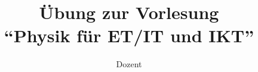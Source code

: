 \documentclass[
	ngerman,
	]{tudaexercise}
\begin{document}
	
\title{Übung zur Vorlesung\\\enquote{Physik für ET/IT und IKT}}
\author{Dozent}

\maketitle
\end{document}
